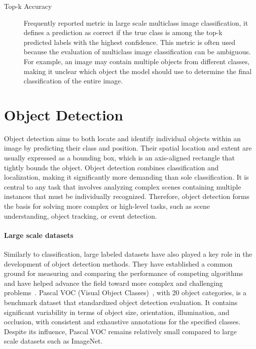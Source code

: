 \begin{description}
    \item[Top-k Accuracy] Frequently reported metric in large scale multiclass image classification, it defines a prediction as correct if the true class is among the top-k predicted labels with the highest confidence. This metric is often used because the evaluation of multiclass image classification can be ambiguous. For example, an image may contain multiple objects from different classes, making it unclear which object the model should use to determine the final classification of the entire image.~\cite{Terven2025, Russakovsky2015}
\end{description}


\section{Object Detection}
Object detection aims to both locate and identify individual objects within an image by predicting their class and position. Their spatial location and extent are usually expressed as a bounding box, which is an axis-aligned rectangle that tightly bounds the object. Object detection combines classification and localization, making it significantly more demanding than sole classification. It is central to any task that involves analyzing complex scenes containing multiple instances that must be individually recognized. Therefore, object detection forms the basis for solving more complex or high-level tasks, such as scene understanding, object tracking, or event detection.~\cite{Liu2020}

\paragraph{Large scale datasets} Similarly to classification, large labeled datasets have also played a key role in the development of object detection methods. They have established a common ground for measuring and comparing the performance of competing algorithms and have helped advance the field toward more complex and challenging problems~\cite{Liu2020}. Pascal VOC (Visual Object Classes)~\cite{Everingham2010}, with 20 object categories, is a benchmark dataset that standardized object detection evaluation. It contains significant variability in terms of object size, orientation, illumination, and occlusion, with consistent and exhaustive annotations for the specified classes. Despite its influence, Pascal VOC remains relatively small compared to large scale datasets such as ImageNet.

